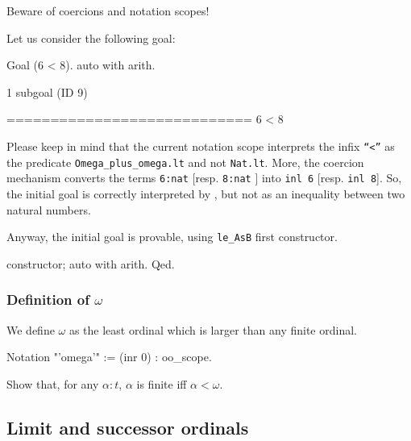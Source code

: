 \begin{remark}
Beware of coercions and notation scopes!

Let us consider the following goal:

\begin{Coqsrc}
 Goal (6 < 8).
 auto with arith.
\end{Coqsrc}


\begin{Coqanswer}
1 subgoal (ID 9)
  
  ============================
  6 < 8
\end{Coqanswer}

Please keep in mind that the current notation scope interprets the infix \texttt{``<''} as the predicate \texttt{Omega\_plus\_omega.lt} and not \texttt{Nat.lt}. More,  the coercion mechanism converts the terms \texttt{6:nat} [resp. \texttt{8:nat} ]
into \texttt{inl 6} [resp. \texttt{inl 8}].  So, the initial goal is correctly interpreted by \coq{}, but not as an inequality between two natural numbers.

Anyway, the initial goal is provable, using \texttt{le\_AsB} first constructor.

\begin{Coqsrc}
  constructor; auto with arith.
Qed.
\end{Coqsrc}

\end{remark}
\subsubsection{Definition of \texorpdfstring{$\omega$}{omega}}

We define $\omega$ as the least ordinal which is larger than any finite ordinal.

\begin{Coqsrc}
 Notation  "'omega'"  := (inr 0) : oo_scope. 
\end{Coqsrc}

\begin{exercise}
Show that, for any $\alpha:t$, $\alpha$ is finite iff $\alpha<\omega$.
\end{exercise}

\subsection{Limit and successor ordinals}



